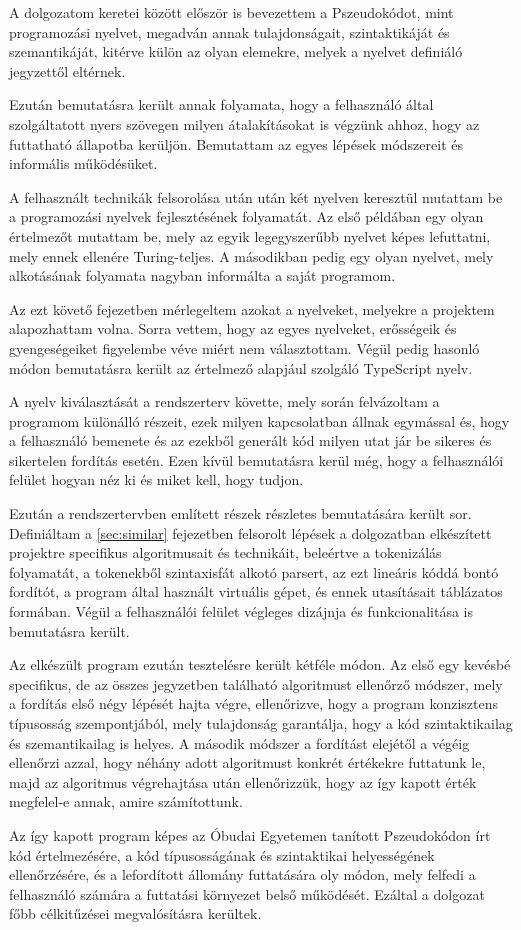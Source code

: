 A dolgozatom keretei között először is bevezettem a Pszeudokódot, mint programozási nyelvet, megadván annak tulajdonságait, szintaktikáját és szemantikáját, kitérve külön az olyan elemekre, melyek a nyelvet definiáló jegyzettől eltérnek.

Ezután bemutatásra került annak folyamata, hogy a felhasználó által szolgáltatott nyers szövegen milyen átalakításokat is végzünk ahhoz, hogy az futtatható állapotba kerüljön. Bemutattam az egyes lépések módszereit és informális működésüket.

A felhasznált technikák felsorolása után után két nyelven keresztül mutattam be a programozási nyelvek fejlesztésének folyamatát. Az első példában egy olyan értelmezőt mutattam be, mely az egyik legegyszerűbb nyelvet képes lefuttatni, mely ennek ellenére Turing-teljes. A másodikban pedig egy olyan nyelvet, mely alkotásának folyamata nagyban informálta a saját programom.

Az ezt követő fejezetben mérlegeltem azokat a nyelveket, melyekre a projektem alapozhattam volna. Sorra vettem, hogy az egyes nyelveket, erősségeik és gyengeségeiket figyelembe véve miért nem választottam. Végül pedig hasonló módon bemutatásra került az értelmező alapjául szolgáló TypeScript nyelv.

A nyelv kiválasztását a rendszerterv követte, mely során felvázoltam a programom különálló részeit, ezek milyen kapcsolatban állnak egymással és, hogy a felhasználó bemenete és az ezekből generált kód milyen utat jár be sikeres és sikertelen fordítás esetén. Ezen kívül bemutatásra kerül még, hogy a felhasználói felület hogyan néz ki és miket kell, hogy tudjon.

Ezután a rendszertervben említett részek részletes bemutatására került sor. Definiáltam a \ref{sec:similar} fejezetben felsorolt lépések a dolgozatban elkészített projektre specifikus algoritmusait és technikáit, beleértve a tokenizálás folyamatát, a tokenekből szintaxisfát alkotó parsert, az ezt lineáris kóddá bontó fordítót, a program által használt virtuális gépet, és ennek utasításait táblázatos formában. Végül a felhasználói felület végleges dizájnja és funkcionalitása is bemutatásra került.

Az elkészült program ezután tesztelésre került kétféle módon. Az első egy kevésbé specifikus, de az összes jegyzetben található algoritmust ellenőrző módszer, mely a fordítás első négy lépését hajta végre, ellenőrizve, hogy a program konzisztens típusosság szempontjából, mely tulajdonság garantálja, hogy a kód szintaktikailag és szemantikailag is helyes. A második módszer a fordítást elejétől a végéig ellenőrzi azzal, hogy néhány adott algoritmust konkrét értékekre futtatunk le, majd az algoritmus végrehajtása után ellenőrizzük, hogy az így kapott érték megfelel-e annak, amire számítottunk.

Az így kapott program képes az Óbudai Egyetemen tanított Pszeudokódon írt kód értelmezésére, a kód típusosságának és szintaktikai helyességének ellenőrzésére, és a lefordított állomány futtatására oly módon, mely felfedi a felhasználó számára a futtatási környezet belső működését. Ezáltal a dolgozat főbb célkitűzései megvalósításra kerültek.
